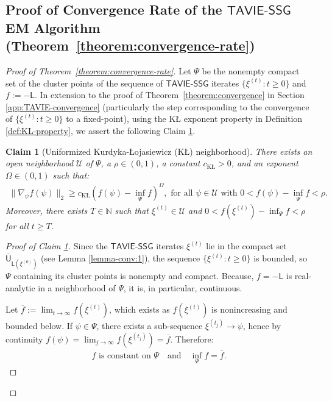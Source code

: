 \documentclass[12pt]{article}
\newtheorem{claim}{Claim}
\numberwithin{equation}{section}
\newcommand{\tssg}{\mathsf{TAVIE}\text{-}\mathsf{SSG}}
\begin{document}
\subsection{Proof of Convergence Rate of the \texorpdfstring{$\tssg$}{TAVIE-SSG} EM Algorithm \texorpdfstring{(Theorem~\ref{theorem:convergence-rate})}{(Theorem 2)}}\label{app:TAVIE-convergence-rate}

\begin{proof}[Proof of Theorem~\ref{theorem:convergence-rate}]
Let $\Psi$ be the nonempty compact set of the cluster points of the sequence of $\tssg$ iterates $\{\xi^{(t)}: t\geq 0\}$ and $f := -\mathsf{L}$. In extension to the proof of Theorem~\ref{theorem:convergence} in Section \ref{app:TAVIE-convergence} (particularly the step corresponding to the convergence of $\{\xi^{(t)}: t\geq 0\}$ to a fixed-point), using the K\L{} exponent property in Definition \ref{def:KL-property}, we assert the following Claim \ref{claim:uniformized-KL}.

\begin{claim}[Uniformized Kurdyka-\L{}ojasiewicz (K\L{}) neighborhood]
\label{claim:uniformized-KL}
There exists an open neighborhood $\mathcal{U}$ of $\Psi$, a $\rho \in (0, 1)$, a constant $c_{\mathrm{K\text{\L}}} > 0$, and an exponent $\Omega \in (0, 1)$ such that:
\begin{align}\label{eq:UKL-1}
    \lVert \nabla_{\psi} f(\psi)\rVert_{2} \geq c_{\mathrm{K\text{\L}}}\left(f(\psi) - \inf_{\Psi} f\right)^{\Omega},\text{ for all } \psi\in \mathcal{U}\text{ with }0<f(\psi) - \inf_{\Psi}f < \rho.
\end{align}
Moreover, there exists $T\in \mathbb{N}$ such that $\xi^{(t)} \in \mathcal{U}$ and $0 < f(\xi^{(t)}) - \inf_{\Psi} f < \rho$ for all $t\geq T$.
\end{claim}
\begin{proof}[Proof of Claim \ref{claim:uniformized-KL}]

Since the $\tssg$ iterates $\xi^{(t)}$ lie in the compact set $\overline{\mathsf{U}}_{\mathsf{L}(\xi^{(0)})}$ (see Lemma \ref{lemma-conv:1}), the sequence $\{\xi^{(t)}: t\geq 0\}$ is bounded, so $\Psi$ containing its cluster points is nonempty and compact. Because, $f = -\mathsf{L}$ is real-analytic in a neighborhood of $\Psi$, it is, in particular, continuous.

Let $\overline{f}:= \lim_{t\to \infty} f(\xi^{(t)})$, which exists as $f(\xi^{(t)})$ is nonincreasing and bounded below. If $\psi \in \Psi$, there exists a sub-sequence $\xi^{(t_j)} \to \psi$, hence by continuity $f(\psi) = \lim_{j\to \infty} f(\xi^{(t_j)}) = \overline{f}$. Therefore:
\begin{align}\label{eq:UKL-2}
    f\text{ is constant on $\Psi$}\quad\text{and}\quad \inf_{\Psi} f = \overline{f}.
\end{align}


\end{proof}
\end{proof}
\end{document}

